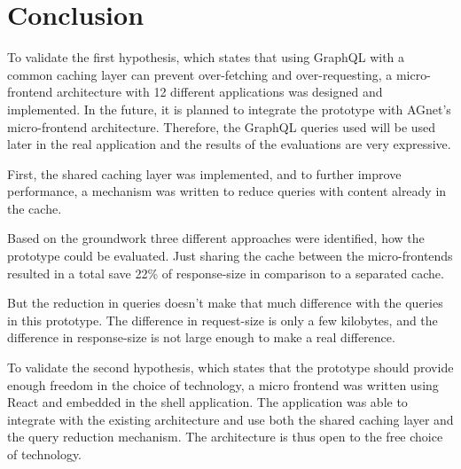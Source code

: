\chapter{Conclusion}\label{chapter:conclusion}

To validate the first hypothesis, which states that using GraphQL with a common caching layer can prevent over-fetching and over-requesting, a micro-frontend architecture with 12 different applications was designed and implemented. In the future, it is planned to integrate the prototype with AGnet's micro-frontend architecture. Therefore, the GraphQL queries used will be used later in the real application and the results of the evaluations are very expressive.

First, the shared caching layer was implemented, and to further improve performance, a mechanism was written to reduce queries with content already in the cache.

Based on the groundwork three different approaches were identified, how the prototype could be evaluated. Just sharing the cache between the micro-frontends resulted in a total save 22\% of response-size in comparison to a separated cache.

But the reduction in queries doesn't make that much difference with the queries in this prototype. The difference in request-size is only a few kilobytes, and the difference in response-size is not large enough to make a real difference.

To validate the second hypothesis, which states that the prototype should provide enough freedom in the choice of technology, a micro frontend was written using React and embedded in the shell application. The application was able to integrate with the existing architecture and use both the shared caching layer and the query reduction mechanism. The architecture is thus open to the free choice of technology.
